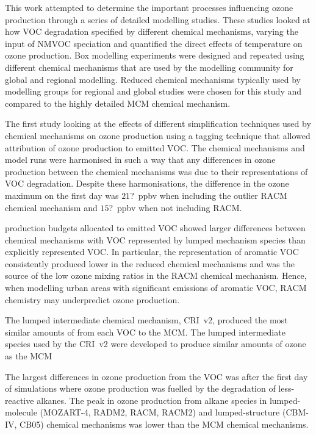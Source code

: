 This work attempted to determine the important processes influencing ozone production through a series of detailed modelling studies.
These studies looked at how VOC degradation specified by different chemical mechanisms, varying the input of NMVOC speciation and quantified the direct effects of temperature on ozone production.
Box modelling experiments were designed and repeated using different chemical mechanisms that are used by the modelling community for global and regional modelling.
Reduced chemical mechanisms typically used by modelling groups for regional and global studies were chosen for this study and compared to the highly detailed MCM chemical mechanism.

The first study looking at the effects of different simplification techniques used by chemical mechanisms on ozone production using a tagging technique that allowed attribution of ozone production to emitted VOC.
The chemical mechanisms and model runs were harmonised in such a way that any differences in ozone production between the chemical mechanisms was due to their representations of VOC degradation.
Despite these harmonisations, the difference in the ozone maximum on the first day was $21$?~ppbv when including the outlier RACM chemical mechanism and $15$?~ppbv when not including RACM.

 production budgets allocated to emitted VOC showed larger differences between chemical mechanisms with VOC represented by lumped mechanism species than explicitly represented VOC.
In particular, the representation of aromatic VOC consistently produced lower  in the reduced chemical mechanisms and was the source of the low ozone mixing ratios in the RACM chemical mechanism.
Hence, when modelling urban areas with significant emissions of aromatic VOC, RACM chemistry may underpredict ozone production.

The lumped intermediate chemical mechanism, CRI~v2, produced the most similar amounts of  from each VOC to the MCM.
The lumped intermediate species used by the CRI~v2 were developed to produce similar amounts of ozone as the MCM

The largest differences in ozone production from the VOC was after the first day of simulations where ozone production was fuelled by the degradation of less-reactive alkanes.
The peak in ozone production from alkane species in lumped-molecule (MOZART-4, RADM2, RACM, RACM2) and lumped-structure (CBM-IV, CB05) chemical mechanisms was lower than the MCM chemical mechanisms.

